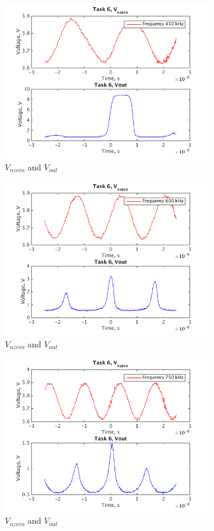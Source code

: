 \documentclass[a4paper,english,11pt]{article}
\begin{document}
\begin{figure}[H]
 \centering
  \includegraphics[width=0.8\textwidth]{img/task_b_2.png}
  \caption{ $V_{nzero}$ and  $V_{out}$}
  \label{freq2}	
\end{figure}

\begin{figure}[H]
 \centering
  \includegraphics[width=0.8\textwidth]{img/task6_b_3.png}
  \caption{ $V_{nzero}$ and  $V_{out}$}
  \label{freq3}	
\end{figure}

\begin{figure}[H]
 \centering
  \includegraphics[width=0.8\textwidth]{img/task6_b_4.png}
  \caption{ $V_{nzero}$ and  $V_{out}$}
  \label{freq4}	
\end{figure}
\end{document}
